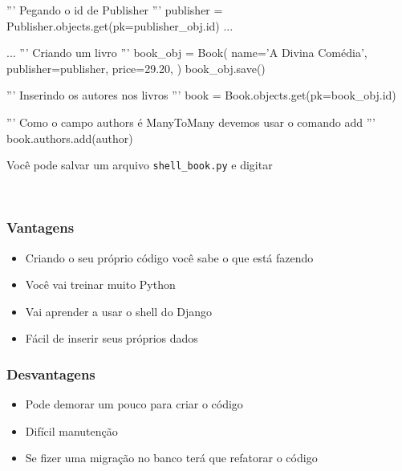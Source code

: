 \documentclass[aspectratio=169]{beamer}
\begin{document}
{\begin{frame}[fragile]
\begin{bashcode}
	''' Pegando o id de Publisher '''
	publisher = Publisher.objects.get(pk=publisher_obj.id)
	...
\end{bashcode}
\end{frame}

\begin{frame}[fragile]

\begin{bashcode}
	...
	''' Criando um livro '''
	book_obj = Book(
	    name='A Divina Comédia',
	    publisher=publisher,
	    price=29.20,
	)
	book_obj.save()

	''' Inserindo os autores nos livros '''
	book = Book.objects.get(pk=book_obj.id)

	''' Como o campo authors é ManyToMany devemos usar o comando add '''
	book.authors.add(author)
\end{bashcode}
\end{frame}


\begin{frame}[fragile]

Você pode salvar um arquivo \texttt{shell\_book.py} e digitar

\


\end{frame}


\begin{frame}\frametitle{Vantagens}

\begin{itemize}
	\item Criando o seu próprio código você sabe o que está fazendo
	\item Você vai treinar muito Python
	\item Vai aprender a usar o shell do Django
	\item Fácil de inserir seus próprios dados
\end{itemize}

\end{frame}


\begin{frame}\frametitle{Desvantagens}

\begin{itemize}
	\item Pode demorar um pouco para criar o código
	\item Difícil manutenção
	\item Se fizer uma migração no banco terá que refatorar o código
\end{itemize}


\end{frame}}
\end{document}

